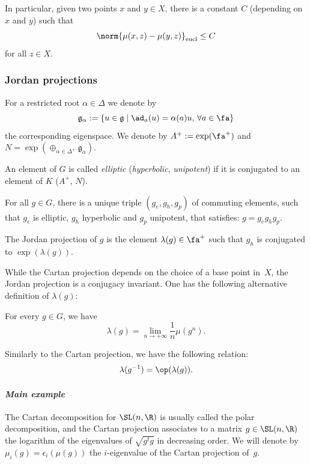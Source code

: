 In particular, given two points $x$ and $y\in X$, there is a constant $C$ (depending on $x$ and $y$) such that
\[\norm{\mu(x,z) - \mu(y,z)}_{\textup{eucl}} \leq C\]
for all $z\in X$.

\subsubsection{Jordan projections}
For a restricted root $\alpha\in \Delta$ we denote by
\[
\mathfrak{g}_\alpha := \{ u \in \mathfrak{g}\mid \ad_a(u) = \alpha(a) u , \, \forall a \in \fa \}
\]
the corresponding eigenspace. We denote by $A^+ := \exp(\fa^+)$ and $N=\exp(\oplus_{\alpha \in \Delta^+} \mathfrak{g}_\alpha) $.

An element of $G$ is called \emph{elliptic} (\resp \emph{hyperbolic}, \emph{unipotent}) if it is conjugated to an element of $K$ (\resp $A^+$, $N$).

\begin{theorem}
For all $g\in G$, there is a unique triple $(g_e, g_h, g_p)$ of commuting elements, such that $g_e$ is elliptic, $g_h$ hyperbolic and $g_p$ unipotent, that satisfies: $g=g_eg_hg_p$.
\end{theorem}

\begin{defi}
The Jordan projection of $g$ is the element $\lambda(g)\in \fa^+$ such that $g_h$ is conjugated to $\exp(\lambda(g))$.
\end{defi}
While the Cartan projection depends on the choice of a base point in~$X$, the Jordan projection is a conjugacy invariant. One has the following alternative definition of $\lambda(g)$:

\begin{prop}
For every $g\in G$, we have
\[\lambda(g) = \lim_{n\to +\infty} \frac{1}{n}\mu(g^n).\]
\end{prop}

\begin{rmk}
Similarly to the Cartan projection, we have the following relation:
\[\lambda(g^{-1}) = \op(\lambda(g)).\]
\end{rmk}

\paragraph{\textit{Main example}}

The Cartan decomposition for $\SL(n,\R)$ is usually called the polar decomposition, and the Cartan projection associates to a matrix $g\in \SL(n,\R)$ the logarithm of the eigenvalues of $\sqrt{g^t g}$ in decreasing order. We will denote by $\mu_i(g) = \epsilon_i(\mu(g))$ the $i$-eigenvalue of the Cartan projection of~$g$.

